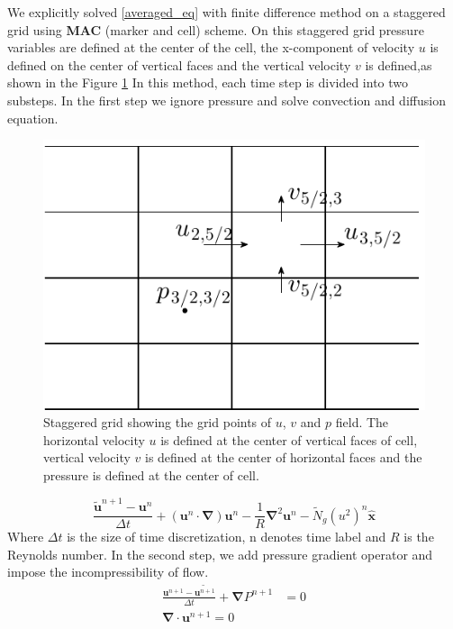 \documentclass[12pt]{report}   %
\newcommand{\bx}{{\boldsymbol{\hat{x}}}}
\newcommand{\bu}{\mathbf{u}}
\newcommand{\grad}{\mathbf{\nabla}}
\newcommand{\Ndg}{\tilde{N}_g}
\begin{document}
We explicitly solved  
\eqref{averaged_eq} with finite difference method on a staggered grid using {\bf{MAC}} (marker and cell) scheme. On this staggered grid pressure variables are defined at the center of the cell, the x-component of velocity $u$ is defined on the center of vertical faces and the vertical velocity $v$ is defined,as shown in the Figure \ref{staggered}
In this method, each time step is divided into two substeps. In the first step we ignore pressure and solve convection and diffusion equation.
\begin{figure}
\centerline{\includegraphics{StaggardGrid}}
\caption{Staggered grid showing the grid points of $u$, $v$ and $p$ field. The horizontal velocity $u$ is defined at the center of vertical faces of cell, vertical velocity $v$ is defined at the center of horizontal faces and the pressure is defined at the center of cell.   }
\label{staggered}
\end{figure}
\begin{equation}
\frac{\tilde{\bu}^{n+1}-\bu^{n}}{\Delta t}+(\bu^n \cdot \grad )\bu^n - \frac{1}{R} \grad^2 \bu^n -\Ndg (u^2)^n\bx
\label{TransportEq}
\end{equation}
Where $\Delta t$ is the size of time discretization, n denotes time label and $R$ is the Reynolds number. In the second step, we add pressure gradient operator and impose the incompressibility of flow.
\begin{equation}
\begin{split}
 \frac{\bu^{n+1}-\tilde{\bu^{n+1}}}{\Delta t} +\grad P^{n+1} &= 0\\
 \grad \cdot \bu^{n+1} = 0
 \label{IncompressibleCondEq}
 \end{split}
\end{equation}
\end{document}

